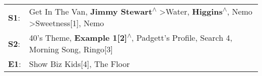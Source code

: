 \begin{supertabular}{p{0.03\textwidth}p{0.92\textwidth}}
 \textbf{S1}:  &  Get In The Van\textsuperscript{}, \enspace \textbf{Jimmy Stewart\textsuperscript{$\wedge$}} \textgreater \enspace Water\textsuperscript{}, \enspace \textbf{Higgins\textsuperscript{$\wedge$}}, \enspace Nemo\textsuperscript{} \textgreater \enspace Sweetness[1]\textsuperscript{}, \enspace Nemo\textsuperscript{}  \enspace  \\
 \textbf{S2}:  &                                                                40's Theme\textsuperscript{}, \enspace \textbf{Example 1[2]\textsuperscript{$\wedge$}}, \enspace Padgett's Profile\textsuperscript{}, \enspace Search 4\textsuperscript{}, \enspace Morning Song\textsuperscript{}, \enspace Ringo[3]\textsuperscript{}  \enspace  \\
 \textbf{E1}:  &                                                                                                                                                                                                                                               Show Biz Kids[4]\textsuperscript{}, \enspace The Floor\textsuperscript{}  \enspace  \\
\end{supertabular}
